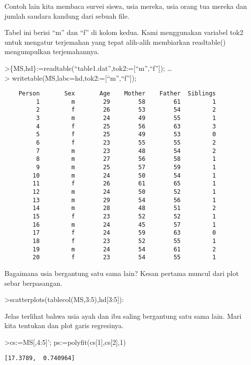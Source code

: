 \documentclass[
]{book}
\begin{document}
Contoh lain kita membaca survei siswa, usia mereka, usia orang tua mereka dan jumlah saudara kandung dari sebuah file.

Tabel ini berisi ``m'' dan ``f'' di kolom kedua. Kami menggunakan variabel tok2 untuk mengatur terjemahan yang tepat alih-alih membiarkan readtable() mengumpulkan terjemahannya.

\textgreater\{MS,hd\}:=readtable(``table1.dat'',tok2:={[}``m'',``f''{]}); \ldots{}\\
\textgreater{} writetable(MS,labc=hd,tok2:={[}``m'',``f''{]});

\begin{verbatim}
    Person       Sex       Age    Mother    Father  Siblings
         1         m        29        58        61         1
         2         f        26        53        54         2
         3         m        24        49        55         1
         4         f        25        56        63         3
         5         f        25        49        53         0
         6         f        23        55        55         2
         7         m        23        48        54         2
         8         m        27        56        58         1
         9         m        25        57        59         1
        10         m        24        50        54         1
        11         f        26        61        65         1
        12         m        24        50        52         1
        13         m        29        54        56         1
        14         m        28        48        51         2
        15         f        23        52        52         1
        16         m        24        45        57         1
        17         f        24        59        63         0
        18         f        23        52        55         1
        19         m        24        54        61         2
        20         f        23        54        55         1
\end{verbatim}

Bagaimana usia bergantung satu sama lain? Kesan pertama muncul dari plot sebar berpasangan.

\textgreater scatterplots(tablecol(MS,3:5),hd{[}3:5{]}):

Jelas terlihat bahwa usia ayah dan ibu saling bergantung satu sama lain. Mari kita tentukan dan plot garis regresinya.

\textgreater cs:=MS{[},4:5{]}'; ps:=polyfit(cs{[}1{]},cs{[}2{]},1)

\begin{verbatim}
[17.3789,  0.740964]
\end{verbatim}
\end{document}
